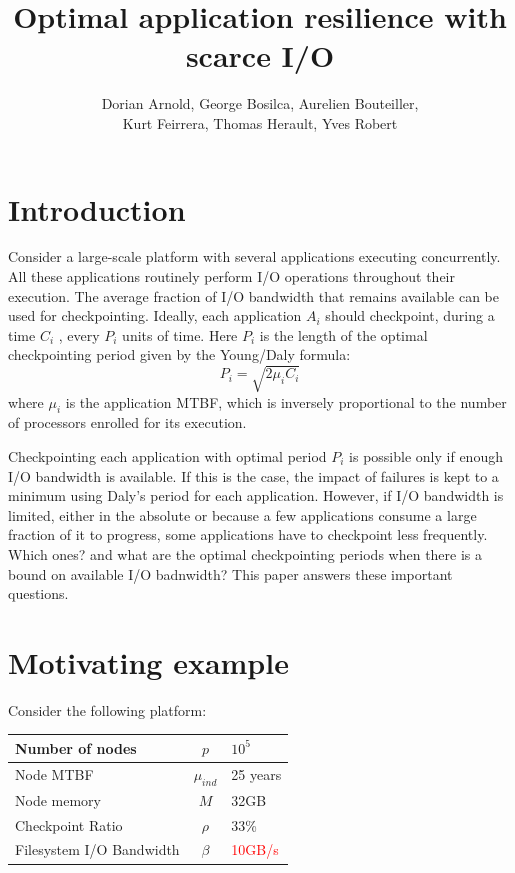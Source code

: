 \documentclass{article}
\author{Dorian Arnold, George Bosilca, Aurelien Bouteiller,\\
 Kurt Feirrera, Thomas Herault, Yves Robert}
\title{Optimal application resilience with scarce I/O}
\begin{document}
\maketitle

\section{Introduction}

Consider a large-scale platform with several applications executing
concurrently. All these applications routinely perform I/O operations
throughout their execution. The average fraction of I/O bandwidth that
remains available can be used for checkpointing. Ideally, each application $A_{i}$
should checkpoint, during a time $C_{i}$ , 
every $P_{i}$ units of time. Here $P_{i}$ is the length of the
optimal checkpointing period given by the Young/Daly formula:
$$P_{i} = \sqrt{2 \mu_{i} C_{i}}$$
where $\mu_{i}$ is the application MTBF, which is inversely proportional to the number of processors enrolled for its execution.
 
Checkpointing each application with optimal period $P_{i}$ is possible
only if enough I/O bandwidth is available. If this is the case, the impact of failures is kept to a minimum using Daly's period for each application.
However, if I/O bandwidth is limited, either in the absolute or because 
a few applications consume a large fraction of  it to progress,
some applications have to checkpoint less frequently.
Which ones? and what are the optimal checkpointing periods when there is a bound
on available I/O  badnwidth? This paper answers these important questions.



\section{Motivating example}

Consider the following platform:

\begin{center}
\begin{tabular}{l|c|l}
  Number of nodes & $p$             & $10^5$ \\\hline
  Node MTBF           & $\mu_{ind}$ & 25 years\\\hline
  Node memory      & $M$             & 32GB\\\hline
  Checkpoint Ratio & $\rho$         & 33\%\\\hline
  Filesystem I/O Bandwidth & $\beta$ & \textcolor{red}{10GB/s}\\
\end{tabular}
\end{center}
\end{document}
